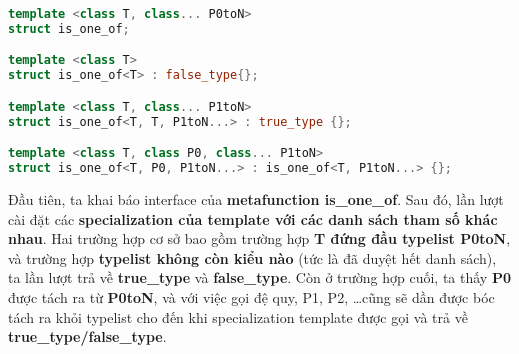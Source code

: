 \begin{lstlisting}[caption={Ví dụ variadic template \cite{Walter}},label={code:variadic},language=C++]
template <class T, class... P0toN>
struct is_one_of;

template <class T>
struct is_one_of<T> : false_type{};

template <class T, class... P1toN>
struct is_one_of<T, T, P1toN...> : true_type {};

template <class T, class P0, class... P1toN>
struct is_one_of<T, P0, P1toN...> : is_one_of<T, P1toN...> {};
\end{lstlisting}
Đầu tiên, ta khai báo interface của \textbf{metafunction is\_one\_of}. Sau đó, lần lượt cài đặt các \textbf{specialization của template với các danh sách tham số khác nhau}. Hai trường hợp cơ sở bao gồm trường hợp \textbf{T đứng đầu typelist P0toN}, và trường hợp \textbf{typelist không còn kiểu nào} (tức là đã duyệt hết danh sách), ta lần lượt trả về \textbf{true\_type} và \textbf{false\_type}. Còn ở trường hợp cuối, ta thấy \textbf{P0} được tách ra từ \textbf{P0toN}, và với việc gọi đệ quy, P1, P2, \dots cũng sẽ dần được bóc tách ra khỏi typelist cho đến khi specialization template được gọi và trả về \textbf{true\_type/false\_type}.
